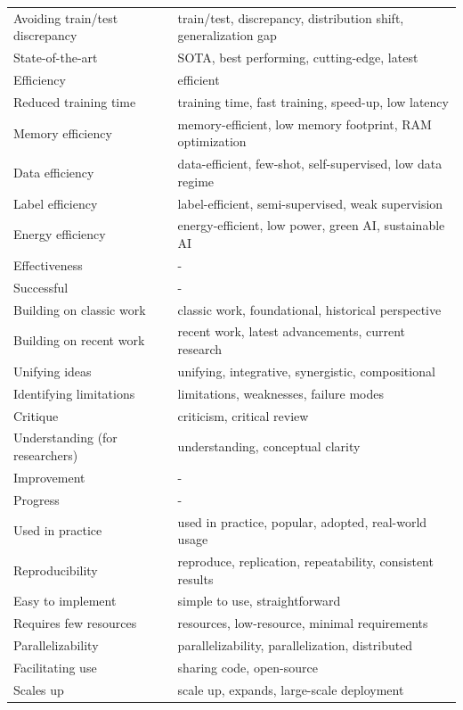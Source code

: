 \documentclass{article}
\begin{document}
\begin{longtable}{|p{5cm}|p{10cm}|}
    Avoiding train/test discrepancy & train/test, discrepancy, distribution shift, generalization gap \\ 
    State-of-the-art & SOTA, best performing, cutting-edge, latest \\ 
    Efficiency & efficient \\ 
    Reduced training time & training time, fast training, speed-up, low latency \\ 
    Memory efficiency & memory-efficient, low memory footprint, RAM optimization \\ 
    Data efficiency & data-efficient, few-shot, self-supervised, low data regime \\ 
    Label efficiency & label-efficient, semi-supervised, weak supervision \\ 
    Energy efficiency & energy-efficient, low power, green AI, sustainable AI \\ 
    Effectiveness & - \\ 
    Successful & - \\ 
    Building on classic work & classic work, foundational, historical perspective \\ 
    Building on recent work & recent work, latest advancements, current research \\ 
    Unifying ideas & unifying, integrative, synergistic, compositional \\ 
    Identifying limitations & limitations, weaknesses, failure modes \\ 
    Critique & criticism, critical review \\ 
    Understanding (for researchers) & understanding, conceptual clarity \\ 
    Improvement & - \\ 
    Progress & - \\ 
    Used in practice & used in practice, popular, adopted, real-world usage \\ 
    Reproducibility & reproduce, replication, repeatability, consistent results \\ 
    Easy to implement & simple to use, straightforward \\ 
    Requires few resources & resources, low-resource, minimal requirements \\ 
    Parallelizability & parallelizability, parallelization, distributed \\ 
    Facilitating use & sharing code, open-source \\ 
    Scales up & scale up, expands, large-scale deployment \\ 

\end{longtable}
\end{document}
